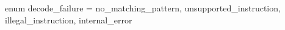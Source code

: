enum decode_failure = { 
  no_matching_pattern, 
  unsupported_instruction, 
  illegal_instruction, 
  internal_error
}
